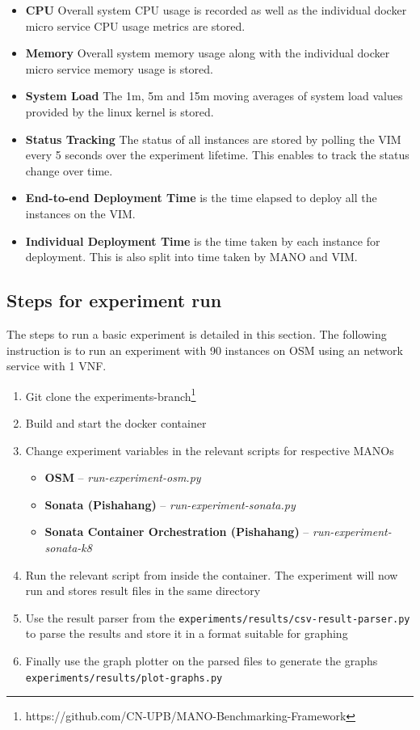 \begin{itemize}
	\item{\textbf{CPU}} Overall system CPU usage is recorded as well as the individual docker micro service CPU usage metrics are stored.
	\item{\textbf{Memory}} Overall system memory usage along with the individual docker micro service memory usage is stored.
	\item{\textbf{System Load}} The 1m, 5m and 15m moving averages of system load values provided by the linux kernel is stored.
	\item{\textbf{Status Tracking}} The status of all instances are stored by polling the VIM every 5 seconds over the experiment lifetime. 
	This enables to track the status change over time.
	\item{\textbf{End-to-end Deployment Time}} is the time elapsed to deploy all the instances on the VIM.
	\item{\textbf{Individual Deployment Time}} is the time taken by each instance for deployment. 
	This is also split into time taken by MANO and VIM.
\end{itemize}

\subsection{Steps for experiment run} 

The steps to run a basic experiment is detailed in this section. 
The following instruction is to run an experiment with 90 instances on OSM using an network service with 1 VNF. 

\begin{enumerate}
	\item Git clone the experiments-branch\footnote{https://github.com/CN-UPB/MANO-Benchmarking-Framework}
	\item Build and start the docker container
	\item Change experiment variables in the relevant scripts for respective MANOs
	\begin{itemize}
		\item \textbf{OSM} -- \textit{run-experiment-osm.py}
		\item \textbf{Sonata (Pishahang)}  -- \textit{run-experiment-sonata.py}
		\item \textbf{Sonata Container Orchestration (Pishahang)} -- \textit{run-experiment-sonata-k8}
	\end{itemize}
	
	\item Run the relevant script from inside the container. 
	The experiment will now run and stores result files in the same directory
	\item Use the result parser from the \texttt{experiments/results/csv-result-parser.py} to parse the results and store it in a format suitable for graphing
	\item Finally use the graph plotter on the parsed files to generate the graphs \texttt{experiments/results/plot-graphs.py}
	
	\end{enumerate}

